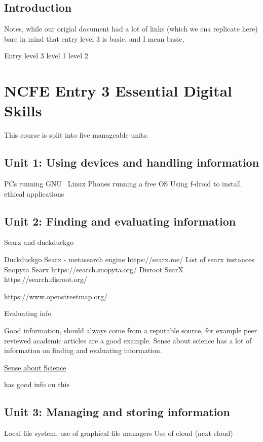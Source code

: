 \section{Introduction}

Notes, while our origial document had a lot of links (which we cna replicate here) bare in mind that entry level 3 is basic, and I mean basic, 

Entry level 3
level 1
level 2


\chapter{NCFE Entry 3 Essential Digital Skills}

This course is split into five manageable units:

\section{Unit 1: Using devices and handling information}

PCs running GNU \ Linux
Phones running a free OS
Using f-droid to install ethical applications 

\section{Unit 2: Finding and evaluating information}

Searx and duckduckgo


    Duckduckgo
    Searx - metasearch engine https://searx.me/
        List of searx instances
        Snopyta Searx https://search.snopyta.org/
        Disroot SearX https://search.disroot.org/

https://www.openstreetmap.org/


Evaluating info

Good information, should always come from a reputable source,  for example peer reviewed academic articles are a good example.   Sense about science has a lot of information on finding and evaluating information. 

\href{https://senseaboutscience.org/}{Sense about Science}

has good info on this

\section{Unit 3: Managing and storing information}

Local file system,  use of graphical file managers
Use of cloud (next cloud)

